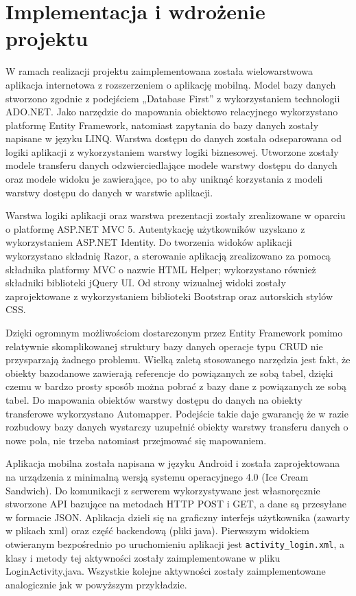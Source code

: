 \documentclass[a4paper,11pt]{article}
\begin{document}
\section{Implementacja i wdrożenie projektu}
W ramach realizacji projektu zaimplementowana została wielowarstwowa aplikacja internetowa z rozszerzeniem o aplikację mobilną. Model bazy danych stworzono zgodnie z podejściem „Database First” z wykorzystaniem technologii ADO.NET. Jako narzędzie do mapowania obiektowo relacyjnego wykorzystano platformę Entity Framework, natomiast zapytania do bazy danych zostały napisane w języku LINQ. Warstwa dostępu do danych została odseparowana od logiki aplikacji z wykorzystaniem warstwy logiki biznesowej. Utworzone zostały modele transferu danych odzwierciedlające modele warstwy dostępu do danych oraz modele widoku je zawierające, po to aby uniknąć korzystania z modeli warstwy dostępu do danych w warstwie aplikacji.

Warstwa logiki aplikacji oraz warstwa prezentacji zostały zrealizowane w oparciu o platformę ASP.NET MVC 5. Autentykację użytkowników uzyskano z wykorzystaniem ASP.NET Identity. Do tworzenia widoków aplikacji wykorzystano składnię Razor, a sterowanie aplikacją zrealizowano za pomocą składnika platformy MVC o nazwie HTML Helper; wykorzystano również składniki biblioteki jQuery UI. Od strony wizualnej widoki zostały zaprojektowane z wykorzystaniem biblioteki Bootstrap oraz autorskich stylów CSS.

Dzięki ogromnym możliwościom dostarczonym przez Entity Framework pomimo relatywnie skomplikowanej struktury bazy danych operacje typu CRUD nie przysparzają żadnego problemu. Wielką zaletą stosowanego narzędzia jest fakt, że obiekty bazodanowe zawierają referencje do powiązanych ze sobą tabel, dzięki czemu w bardzo prosty sposób można pobrać z bazy dane z powiązanych ze sobą tabel. Do mapowania obiektów warstwy dostępu do danych na obiekty transferowe wykorzystano Automapper. Podejście takie daje gwarancję że w razie rozbudowy bazy danych wystarczy uzupełnić obiekty warstwy transferu danych o nowe pola, nie trzeba natomiast przejmować się mapowaniem.

Aplikacja mobilna została napisana w języku Android i została zaprojektowana na urządzenia z minimalną wersją systemu operacyjnego 4.0 (Ice Cream Sandwich). Do komunikacji z serwerem wykorzystywane jest własnoręcznie stworzone API bazujące na metodach HTTP POST i GET, a dane są przesyłane w formacie JSON. Aplikacja dzieli się na graficzny interfejs użytkownika (zawarty w plikach xml) oraz część backendową (pliki java). Pierwszym widokiem otwieranym bezpośrednio po uruchomieniu aplikacji jest \texttt{activity\_login.xml}, a klasy i metody tej aktywności zostały zaimplementowane w pliku LoginActivity.java. Wszystkie kolejne aktywności zostały zaimplementowane analogicznie jak w powyższym przykładzie.
\end{document}
